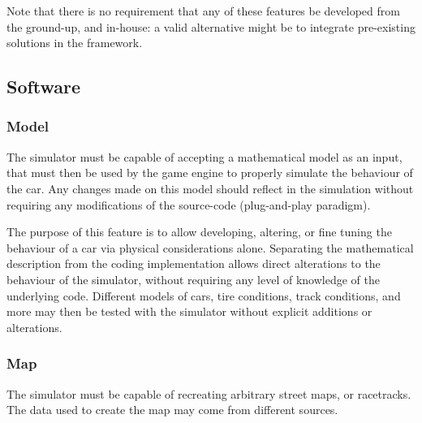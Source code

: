Note that there is no requirement that any of these \glspl{feature} be developed from the ground-up, and in-house: a valid alternative might be to integrate pre-existing solutions in the \gls{framework}.



\subsection{Software}

\subsubsection{Model}

The simulator must be capable of accepting a mathematical model as an input, that must then be used by the game engine to properly simulate the behaviour of the car. Any changes made on this model should reflect in the simulation without requiring any modifications of the source-code (plug-and-play paradigm).

The purpose of this \gls{feature} is to allow developing, altering, or fine tuning the behaviour of a car via physical considerations alone. Separating the mathematical description from the coding implementation allows direct alterations to the behaviour of the simulator, without requiring any level of knowledge of the underlying code. Different models of cars, tire conditions, track conditions, and more may then be tested with the simulator without explicit additions or alterations.

\subsubsection{Map}

The simulator must be capable of recreating arbitrary street maps, or racetracks. The data used to create the map may come from different sources.

